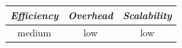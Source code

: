 %
%

%
%
%
%

\begin{center}
\begin{tabular}{ccc}
\emph{Efficiency} & \emph{Overhead} & \emph{Scalability} \\
\hline
medium &
low &
low
\end{tabular}
\end{center}

